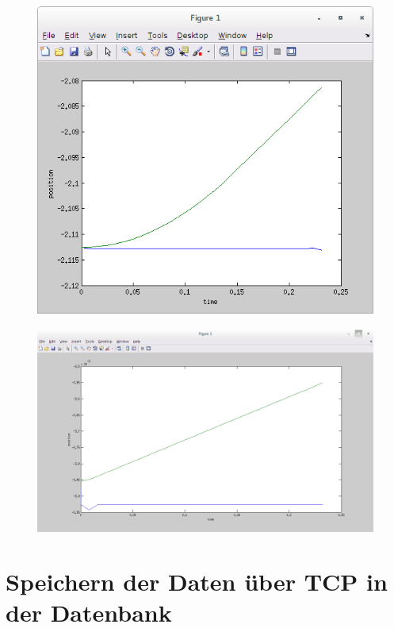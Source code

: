 \begin{figure}[H]
  \centering
    \includegraphics[width=1\textwidth]{pic/joint1_position_capi.png}
      \caption[Soll und Ist Werte der Position des 2.Gelenks]{}
      \label{fig:joint_1_position_capi}
\end{figure}

\begin{figure}[H]
  \centering
    \includegraphics[width=1\textwidth]{pic/joint5_position_capi.png}
      \caption[Position der Soll und Ist Werte für das 5. Gelenk]{}
      \label{fig:position_joint5_capi}
\end{figure}

\section{Speichern der Daten über TCP in der Datenbank}
\label{save_data_tcp_code_gru}

